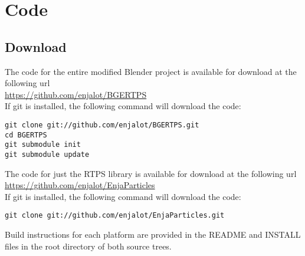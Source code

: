 \chapter{Code}
\section{Download}
\label{appendix:download}
The code for the entire modified Blender project is available for download at the following url \\
\url{https://github.com/enjalot/BGERTPS} \\
If git\cite{Git} is installed, the following command will
download the code: 
\begin{verbatim}
git clone git://github.com/enjalot/BGERTPS.git
cd BGERTPS
git submodule init
git submodule update
\end{verbatim} 

The code for just the RTPS library is available for download at the following url \\ 
\url{https://github.com/enjalot/EnjaParticles} \\
If git\cite{Git} is installed, the following command will
download the code: 
\begin{verbatim}
git clone git://github.com/enjalot/EnjaParticles.git
\end{verbatim} 


Build instructions for each platform are provided in the README and INSTALL
files in the root directory of both source trees.


